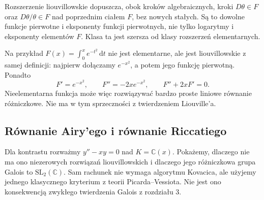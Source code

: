 \documentclass[11pt,a4paper,oneside]{book}
\numberwithin{equation}{section}
\theoremstyle{plain}
\theoremstyle{definition}
\theoremstyle{remark}
\newcommand{\C}{\mathbb{C}}
\newcommand{\dd}{\,\mathrm{d}}
\begin{document}
Rozszerzenie liouvillowskie dopuszcza, obok kroków algebraicznych, kroki $D\theta\in F$ oraz $D\theta/\theta\in F$ nad poprzednim ciałem $F$, bez nowych stałych. Są to dowolne funkcje pierwotne i eksponenty funkcji pierwotnych, nie tylko logarytmy i eksponenty elementów $F$. Klasa ta jest szersza od klasy rozszerzeń elementarnych.

Na przykład $F(x)=\int_0^x e^{-t^2}\dd t$ nie jest elementarne, ale jest liouvillowskie z samej definicji: najpierw dołączamy $e^{-x^2}$, a potem jego funkcję pierwotną. Ponadto
\[
F'=e^{-x^2},\qquad F''=-2xe^{-x^2},\qquad F''+2xF'=0.
\]
Nieelementarna funkcja może więc rozwiązywać bardzo proste liniowe równanie różniczkowe. Nie ma w tym sprzeczności z twierdzeniem Liouville'a.

\subsection*{Równanie Airy'ego i równanie Riccatiego}

Dla kontrastu rozważmy $y''-xy=0$ nad $K=\C(x)$. Pokażemy, dlaczego nie ma ono niezerowych rozwiązań liouvillowskich i dlaczego jego różniczkowa grupa Galois to $\mathrm{SL}_2(\C)$. Sam rachunek nie wymaga algorytmu Kovacica, ale użyjemy jednego klasycznego kryterium z teorii Picarda--Vessiota. Nie jest ono konsekwencją zwykłego twierdzenia Galois z rozdziału 3.
\end{document}
